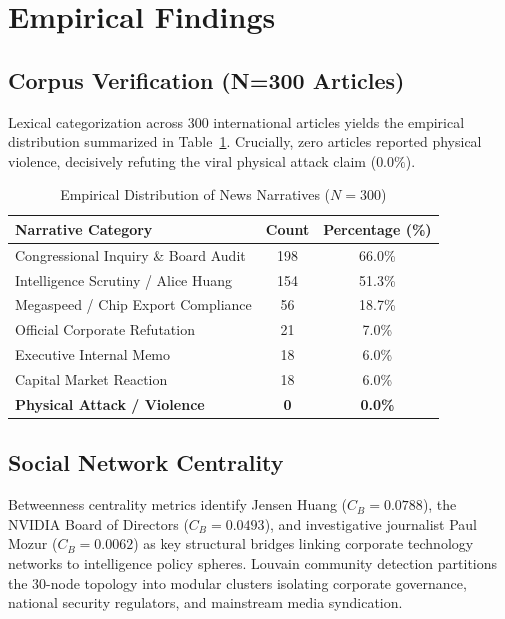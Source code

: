 \documentclass[journal,10pt,compsoc]{IEEEtran}
\begin{document}
\section{Empirical Findings}

\subsection{Corpus Verification (N=300 Articles)}
Lexical categorization across 300 international articles yields the empirical distribution summarized in Table~\ref{tab:corpus}. Crucially, zero articles reported physical violence, decisively refuting the viral physical attack claim ($0.0\%$).

\begin{table}[h]
\caption{Empirical Distribution of News Narratives ($N=300$)}
\label{tab:corpus}
\centering
\begin{tabular}{lcc}
\toprule
\textbf{Narrative Category} & \textbf{Count} & \textbf{Percentage (\%)} \\
\midrule
Congressional Inquiry \& Board Audit & 198 & 66.0\% \\
Intelligence Scrutiny / Alice Huang & 154 & 51.3\% \\
Megaspeed / Chip Export Compliance & 56 & 18.7\% \\
Official Corporate Refutation & 21 & 7.0\% \\
Executive Internal Memo & 18 & 6.0\% \\
Capital Market Reaction & 18 & 6.0\% \\
\textbf{Physical Attack / Violence} & \textbf{0} & \textbf{0.0\%} \\
\bottomrule
\end{tabular}
\end{table}

\subsection{Social Network Centrality}
Betweenness centrality metrics identify Jensen Huang ($C_B = 0.0788$), the NVIDIA Board of Directors ($C_B = 0.0493$), and investigative journalist Paul Mozur ($C_B = 0.0062$) as key structural bridges linking corporate technology networks to intelligence policy spheres. Louvain community detection partitions the $30$-node topology into modular clusters isolating corporate governance, national security regulators, and mainstream media syndication.
\end{document}
